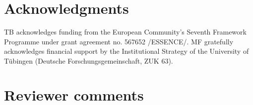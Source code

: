 \documentclass[10pt,a4paper]{article}
\begin{document}
\section{Acknowledgments}
TB   acknowledges   funding   from   the   European   Community's Seventh Framework Programme under grant agreement no.  567652 /ESSENCE/.  
MF gratefully acknowledges financial support by the Institutional Strategy of the University
of T\"{u}bingen (Deutsche Forschungsgemeinschaft, ZUK 63). 






\setlength{\bibleftmargin}{.125in}
\setlength{\bibindent}{-\bibleftmargin}


\newpage
\newpage
\section*{Reviewer comments}
\end{document}
